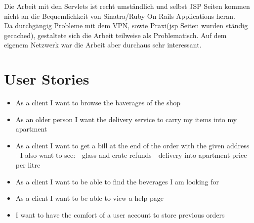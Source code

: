 \documentclass[a4paper, 11pt]{article}
\begin{document}
Die Arbeit mit den Servlets ist recht umständlich und selbst JSP Seiten kommen nicht an die Bequemlichkeit von Sinatra/Ruby On Rails Applications heran. \\
Da durchgängig Probleme mit dem VPN, sowie Praxi(jsp Seiten wurden ständig gecached), gestaltete sich die Arbeit teilweise als Problematisch. Auf dem eigenem Netzwerk war die 
Arbeit aber durchaus sehr interessant. 
\section{User Stories}
\begin{itemize}
	\item As a client I want to browse the baverages of the shop
	\item As an older person I want the delivery service to carry my items into my apartment
	\item As a client I want to get a bill at the end of the order with the given address
		- I also want to see:
			- glass and crate refunds
			- delivery-into-apartment price per litre
	\item As a client I want to be able to find the beverages I am looking for
	\item As a client I want to be able to view a help page
	\item I want to have the comfort of a user account to store previous orders
	\end{itemize}
\end{document}
